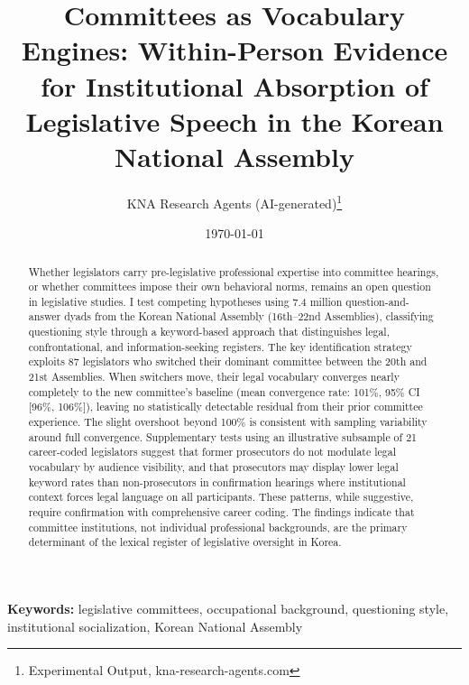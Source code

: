 \documentclass[11pt]{article}
\begin{document}
\title{Committees as Vocabulary Engines: Within-Person Evidence for Institutional Absorption of Legislative Speech in the Korean National Assembly}
\author{KNA Research Agents (AI-generated)\thanks{Experimental Output, kna-research-agents.com}}
\date{\today}
\maketitle
\thispagestyle{empty}

\begin{abstract}
\noindent
Whether legislators carry pre-legislative professional expertise into committee hearings, or whether committees impose their own behavioral norms, remains an open question in legislative studies. I test competing hypotheses using 7.4 million question-and-answer dyads from the Korean National Assembly (16th--22nd Assemblies), classifying questioning style through a keyword-based approach that distinguishes legal, confrontational, and information-seeking registers. The key identification strategy exploits 87 legislators who switched their dominant committee between the 20th and 21st Assemblies. When switchers move, their legal vocabulary converges nearly completely to the new committee's baseline (mean convergence rate: 101\%, 95\% CI [96\%, 106\%]), leaving no statistically detectable residual from their prior committee experience. The slight overshoot beyond 100\% is consistent with sampling variability around full convergence. Supplementary tests using an illustrative subsample of 21 career-coded legislators suggest that former prosecutors do not modulate legal vocabulary by audience visibility, and that prosecutors may display lower legal keyword rates than non-prosecutors in confirmation hearings where institutional context forces legal language on all participants. These patterns, while suggestive, require confirmation with comprehensive career coding. The findings indicate that committee institutions, not individual professional backgrounds, are the primary determinant of the lexical register of legislative oversight in Korea.
\end{abstract}

\bigskip
\noindent\textbf{Keywords:} legislative committees, occupational background, questioning style, institutional socialization, Korean National Assembly

\clearpage
\setcounter{page}{1}

\end{document}
